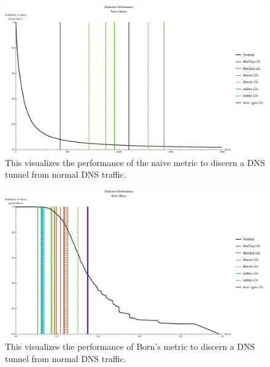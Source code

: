 \documentclass[12pt]{report}
\theoremstyle{remark}
\theoremstyle{definition}
\theoremstyle{definition}
\theoremstyle{definition}
\begin{document}
\begin{figure}
\centering
\includegraphics[width=\textwidth]{figures/mpnv.pdf}
\caption[Detection Thresholds Under the Naive Metric]{This visualizes the performance of the naive metric to discern a DNS tunnel from normal DNS traffic.}
\label{mpnv}
\end{figure}

\begin{figure}
\centering
\includegraphics[width=\textwidth]{figures/mpbv.pdf}
\caption[Detection Thresholds Under Born's Metric]{This visualizes the performance of Born's metric to discern a DNS tunnel from normal DNS traffic.}
\label{mpbv}
\end{figure}
\end{document}

